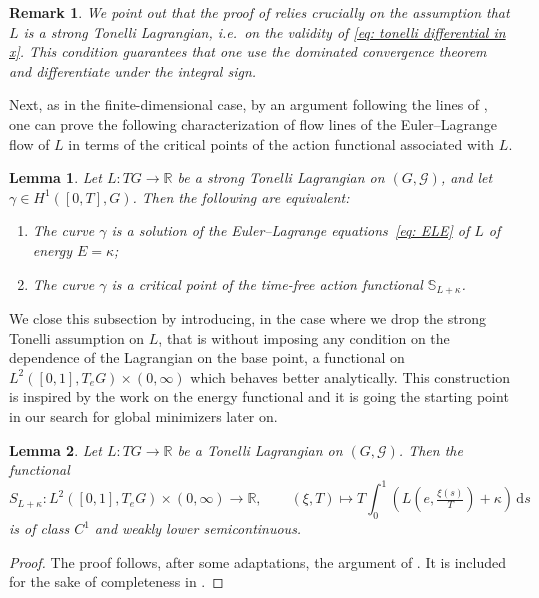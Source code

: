 \documentclass[11pt,reqno]{amsart}
\theoremstyle{plain}
\newtheorem{lem}[thm]{Lemma}
\newtheorem{rem}[thm]{Remark}
\theoremstyle{definition}
\theoremstyle{plain} %
\newtheorem{lem}[lem]{Lemma}
\newtheorem{rem}[rem]{Remark}
\theoremstyle{definition} %
\numberwithin{equation}{section}
\def\G{\mathcal{G}}
\def\RR{{\mathbb R}}
\def\SS{{\mathbb{S}}}
\begin{document}
\begin{rem}
    We point out that the proof of  relies crucially on the assumption that \( L \) is a strong Tonelli Lagrangian, i.e.\ on the validity of \eqref{eq: tonelli differential in x}. This condition guarantees that one use the dominated convergence theorem and differentiate under the integral sign.
\end{rem}
Next, as in the finite-dimensional case, by an argument following the lines of \cite[Eq.~(3.6), Eq.~(3.7)]{Abbo13Lect}, one can prove the following characterization of flow lines of the Euler–Lagrange flow of \( L \) in terms of the critical points of the action functional associated with \( L \).
\begin{lem}\label{lemma:ELE anc solutions}
Let $L:TG\to \RR$ be a strong Tonelli Lagrangian on $(G,\G)$, and let 
\( \gamma\in H^1([0,T],G)\). Then the following are equivalent:
\begin{enumerate}
    \item The curve \( \gamma \) is a solution of the Euler--Lagrange equations~\eqref{eq: ELE} of $L$ of energy $E=\kappa$; \label{itm:i}
    \item The curve \( \gamma \) is a critical point of the time-free action functional \( \SS_{L+\kappa} \). 
 \label{itm:ii}
\end{enumerate}
\end{lem}
We close this subsection by introducing, in the case where we drop the strong Tonelli assumption on \( L \), that is without imposing any condition on the dependence of the Lagrangian on the base point, a functional on \( L^2([0,1], T_e G) \times (0, \infty) \) which behaves better analytically. This construction is inspired by the work \cite{Bauer_2025} on the energy functional and it is going the starting point in our search for global minimizers later on.

\begin{lem}\label{lemma:regularity}
    Let \( L : TG \to \mathbb{R} \) be a Tonelli Lagrangian on \( (G, \mathcal{G}) \). Then the functional
    \begin{equation}\label{eq:func_on_tangent}
        S_{L+\kappa} \colon L^2([0,1], T_e G) \times (0, \infty) \to \mathbb{R}, \qquad
        (\xi, T) \mapsto T \int_0^1 \left( L\!\left(e, \tfrac{\xi(s)}{T}\right) + \kappa \right) \, \mathrm{d}s
    \end{equation}
    is of class \( C^1 \) and weakly lower semicontinuous.
\end{lem}
\begin{proof}
    The proof follows, after some adaptations, the argument of \cite[Prop.~3.1]{AbbondandoloSchwarz2009}. It is included for the sake of completeness in .
\end{proof}
\end{document}
